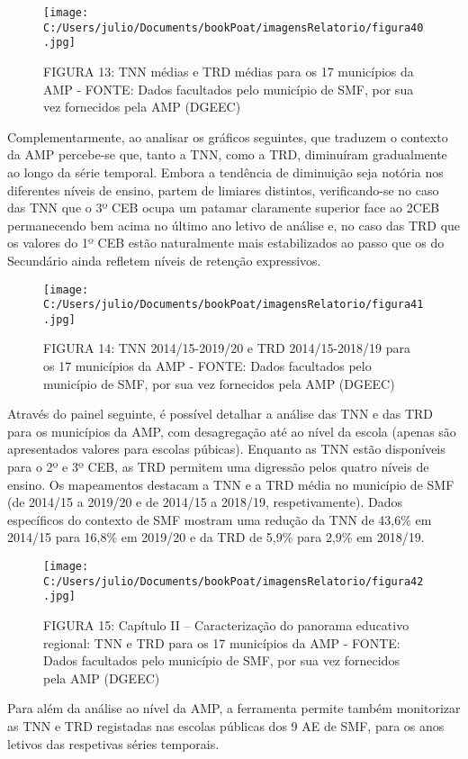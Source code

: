 \documentclass[
]{book}
\begin{document}
\begin{figure}
\centering
\texttt{[image: C:/Users/julio/Documents/bookPoat/imagensRelatorio/figura40.jpg]}
\caption{FIGURA 13: TNN médias e TRD médias para os 17 municípios da AMP - FONTE: Dados facultados pelo município de SMF, por sua vez fornecidos pela AMP (DGEEC)}
\end{figure}

Complementarmente, ao analisar os gráficos seguintes, que traduzem o contexto da AMP percebe-se que, tanto a TNN, como a TRD, diminuíram gradualmente ao longo da série temporal. Embora a tendência de diminuição seja notória nos diferentes níveis de ensino, partem de limiares distintos, verificando-se no caso das TNN que o 3º CEB ocupa um patamar claramente superior face ao 2CEB permanecendo bem acima no último ano letivo de análise e, no caso das TRD que os valores do 1º CEB estão naturalmente mais estabilizados ao passo que os do Secundário ainda refletem níveis de retenção expressivos.

\begin{figure}
\centering
\texttt{[image: C:/Users/julio/Documents/bookPoat/imagensRelatorio/figura41.jpg]}
\caption{FIGURA 14: TNN 2014/15-2019/20 e TRD 2014/15-2018/19 para os 17 municípios da AMP - FONTE: Dados facultados pelo município de SMF, por sua vez fornecidos pela AMP (DGEEC)}
\end{figure}

Através do painel seguinte, é possível detalhar a análise das TNN e das TRD para os municípios da AMP, com desagregação até ao nível da escola (apenas são apresentados valores para escolas púbicas). Enquanto as TNN estão disponíveis para o 2º e 3º CEB, as TRD permitem uma digressão pelos quatro níveis de ensino. Os mapeamentos destacam a TNN e a TRD média no município de SMF (de 2014/15 a 2019/20 e de 2014/15 a 2018/19, respetivamente). Dados específicos do contexto de SMF mostram uma redução da TNN de 43,6\% em 2014/15 para 16,8\% em 2019/20 e da TRD de 5,9\% para 2,9\% em 2018/19.

\begin{figure}
\centering
\texttt{[image: C:/Users/julio/Documents/bookPoat/imagensRelatorio/figura42.jpg]}
\caption{FIGURA 15: Capítulo II -- Caracterização do panorama educativo regional: TNN e TRD para os 17 municípios da AMP - FONTE: Dados facultados pelo município de SMF, por sua vez fornecidos pela AMP (DGEEC)}
\end{figure}

Para além da análise ao nível da AMP, a ferramenta permite também monitorizar as TNN e TRD registadas nas escolas públicas dos 9 AE de SMF, para os anos letivos das respetivas séries temporais.
\end{document}
